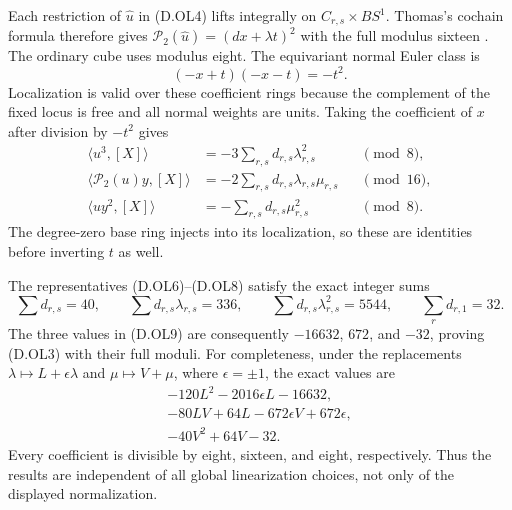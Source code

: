 Each restriction of $\widehat u$ in (D.OL4) lifts integrally on
$C_{r,s}\times BS^1$. Thomas's cochain formula therefore gives
$\mathcal P_2(\widehat u)=(d x+\lambda t)^2$ with the full
modulus sixteen \cite[equations (2.1), (3.4), pp.267--268]{ffThomas56}.
The ordinary cube uses modulus eight. The equivariant normal Euler
class is
\[
                           (-x+t)(-x-t)=-t^2.
\]
Localization is valid over these coefficient rings because the
complement of the fixed locus is free and all normal weights are
units. Taking the coefficient of $x$ after division by $-t^2$ gives
\[
 \begin{aligned}
 \langle u^3,[X]\rangle&=-3\sum_{r,s}d_{r,s}\lambda_{r,s}^2
                                                        &&\pmod8,\\
 \langle\mathcal P_2(u)y,[X]\rangle
       &=-2\sum_{r,s}d_{r,s}\lambda_{r,s}\mu_{r,s}
                                                        &&\pmod{16},\\
 \langle uy^2,[X]\rangle&=-\sum_{r,s}d_{r,s}\mu_{r,s}^2
                                                        &&\pmod8.
 \end{aligned}                                             \tag{D.OL9}
\]
The degree-zero base ring injects into its localization, so these
are identities before inverting $t$ as well.

The representatives (D.OL6)--(D.OL8) satisfy the exact integer sums
\[
 \sum d_{r,s}=40,\qquad \sum d_{r,s}\lambda_{r,s}=336,
 \qquad \sum d_{r,s}\lambda_{r,s}^2=5544,
 \qquad \sum_r d_{r,1}=32.                               \tag{D.OL10}
\]
The three values in (D.OL9) are consequently $-16632$, $672$,
and $-32$, proving (D.OL3) with their full moduli.
For completeness, under the replacements
$\lambda\mapsto L+\epsilon\lambda$ and $\mu\mapsto V+\mu$,
where $\epsilon=\pm1$, the exact values are
\[
 \begin{aligned}
 -120L^2-2016\epsilon L-16632,\\
 -80LV+64L-672\epsilon V+672\epsilon,\\
 -40V^2+64V-32.
 \end{aligned}                                             \tag{D.OL11}
\]
Every coefficient is divisible by eight, sixteen, and eight,
respectively. Thus the results are independent of all global
linearization choices, not only of the displayed normalization.

